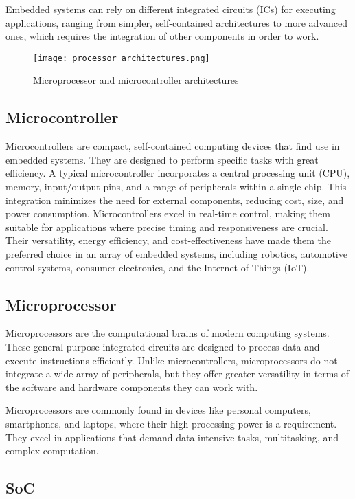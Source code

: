 Embedded systems can rely on different integrated circuits (ICs) for executing
applications, ranging from simpler, self-contained architectures to more
advanced ones, which requires the integration of other components in order
to work.

\begin{figure}[ht]
    \centering
    \texttt{[image: processor\_architectures.png]}
    \caption{Microprocessor and microcontroller architectures}
\end{figure}

\subsection{Microcontroller}

Microcontrollers are compact, self-contained computing devices that find use in
embedded systems. They are designed to perform specific tasks with great
efficiency.
A typical microcontroller incorporates a central processing unit (CPU), memory,
input/output pins, and a range of peripherals within a single chip.
This integration minimizes the need for external components, reducing cost,
size, and power consumption.
Microcontrollers excel in real-time control, making them suitable for
applications where precise timing and responsiveness are crucial.
Their versatility, energy efficiency, and cost-effectiveness have made them
the preferred choice in an array of embedded systems, including robotics,
automotive control systems, consumer electronics, and the Internet of Things 
(IoT).

\subsection{Microprocessor}

Microprocessors are the computational brains of modern computing systems.
These general-purpose integrated circuits are designed to process data and
execute instructions efficiently. Unlike microcontrollers, microprocessors
do not integrate a wide array of peripherals, but they offer greater
versatility in terms of the software and hardware components they can work
with.

Microprocessors are commonly found in devices like personal computers,
smartphones, and laptops, where their high processing power is a requirement.
They excel in applications that demand data-intensive tasks, multitasking, and
complex computation.

\subsection{SoC}

